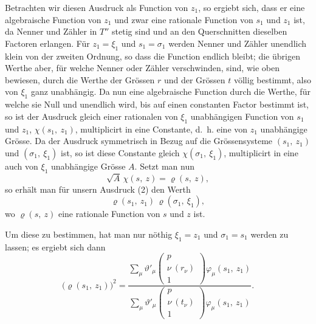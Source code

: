 \documentclass[12pt,a4paper]{article}
\begin{document}
Betrachten wir diesen Ausdruck als Function von $z_1$, so ergiebt sich, dass er eine algebraische Function von $z_1$ und zwar eine rationale Function von $s_1$ und $z_1$ ist, da Nenner und Zähler in $T''$ stetig sind und an den Querschnitten dieselben Factoren erlangen. Für $z_1 = \xi_1$ und $s_1 = \sigma_1$ werden Nenner und Zähler unendlich klein von der zweiten Ordnung, so dass die Function endlich bleibt; die übrigen Werthe aber, für welche Nenner oder Zähler verschwinden, sind, wie oben bewiesen, durch die Werthe der Grössen $r$ und der Grössen $t$ völlig bestimmt, also von $\xi_1$ ganz unabhängig. Da nun eine algebraische Function durch die Werthe, für welche sie Null und unendlich wird, bis auf einen constanten Factor bestimmt ist, so ist der Ausdruck gleich einer rationalen von $\xi_1$ unabhängigen Function von $s_1$ und $z_1$, $\chi(s_1,\ z_1)$, multiplicirt in eine Constante, d.~h. eine von $z_1$ unabhängige Grösse. Da der Ausdruck symmetrisch in Bezug auf die Grössensysteme $(s_1,\ z_1)$ und $(\sigma_1,\ \xi_1)$ ist, so ist diese Constante gleich $\chi(\sigma_1,\ \xi_1)$, multiplicirt in eine auch von $\xi_1$ unabhängige Grösse $A$. Setzt man nun
\[ \sqrt{A}\,\chi(s,\ z) = \varrho(s,\ z), \]
so erhält man für unsern Ausdruck (2) den Werth
\begin{equation}
\tag{3} \varrho(s_1,\ z_1)\,\varrho(\sigma_1,\ \xi_1), \end{equation}
wo $\varrho(s,\ z)$ eine rationale Function von $s$ und $z$ ist.

Um diese zu bestimmen, hat man nur nöthig $\xi_1 = z_1$ und $\sigma_1 = s_1$ werden zu lassen; es ergiebt sich dann
\begin{equation}
\tag{4} \bigl(\varrho(s_1,\ z_1)\bigr)^2 = \frac{\sum\limits_\mu \vartheta'_\mu\left(\begin{array}{c} p\\ \nu\ (r_\nu)\\ 1 \end{array}\right) \varphi_\mu(s_1,\ z_1)}{\sum\limits_\mu \vartheta'_\mu\left(\begin{array}{c} p\\ \nu\ (t_\nu)\\ 1 \end{array}\right) \varphi_\mu(s_1,\ z_1)}. \end{equation}
\end{document}
